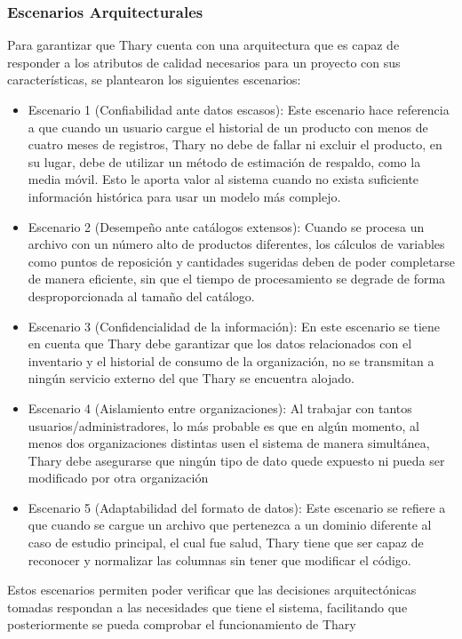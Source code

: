 \subsubsection{Escenarios Arquitecturales}
Para garantizar que Thary cuenta con una arquitectura que es capaz de responder a los atributos de calidad necesarios para un proyecto con sus características, se plantearon los siguientes escenarios:
\begin{itemize}
    \item Escenario 1 (Confiabilidad ante datos escasos): Este escenario hace referencia a que cuando un usuario cargue el historial de un producto con menos de cuatro meses de registros, Thary no debe de fallar ni excluir el producto, en su lugar, debe de utilizar un método de estimación de respaldo, como la media móvil. Esto le aporta valor al sistema cuando no exista suficiente información histórica para usar un modelo más complejo.
    \item Escenario 2 (Desempeño ante catálogos extensos): Cuando se procesa un archivo con un número alto de productos diferentes, los cálculos de variables como puntos de reposición y cantidades sugeridas deben de poder completarse de manera eficiente, sin que el tiempo de procesamiento se degrade de forma desproporcionada al tamaño del catálogo.
    \item Escenario 3 (Confidencialidad de la información): En este escenario se tiene en cuenta que Thary debe garantizar que los datos relacionados con el inventario y el historial de consumo de la organización, no se transmitan a ningún servicio externo del que Thary se encuentra alojado.
    \item Escenario 4 (Aislamiento entre organizaciones): Al trabajar con tantos usuarios/administradores, lo más probable es que en algún momento, al menos dos organizaciones distintas usen el sistema de manera simultánea, Thary debe asegurarse que ningún tipo de dato quede expuesto ni pueda ser modificado por otra organización
    \item Escenario 5 (Adaptabilidad del formato de datos): Este escenario se refiere a que cuando se cargue un archivo que pertenezca a un dominio diferente al caso de estudio principal, el cual fue salud, Thary tiene que ser capaz de reconocer y normalizar las columnas sin tener que modificar el código.
\end{itemize}

Estos escenarios permiten poder verificar que las decisiones arquitectónicas tomadas respondan a las necesidades que tiene el sistema, facilitando que posteriormente se pueda comprobar el funcionamiento de Thary

